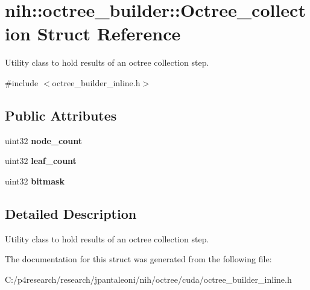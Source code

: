 \hypertarget{structnih_1_1octree__builder_1_1_octree__collection}{
\section{nih\-:\-:octree\-\_\-builder\-:\-:\-Octree\-\_\-collection \-Struct \-Reference}
\label{structnih_1_1octree__builder_1_1_octree__collection}
}


\-Utility class to hold results of an octree collection step.  




{\ttfamily \#include $<$octree\-\_\-builder\-\_\-inline.\-h$>$}

\subsection*{\-Public \-Attributes}
\begin{DoxyCompactItemize}
\item 
\hypertarget{structnih_1_1octree__builder_1_1_octree__collection_ae76a8db6a832f216c484c40f6fce3be2}{
uint32 {\bfseries node\-\_\-count}}
\label{structnih_1_1octree__builder_1_1_octree__collection_ae76a8db6a832f216c484c40f6fce3be2}

\item 
\hypertarget{structnih_1_1octree__builder_1_1_octree__collection_a09baa2dbea46563007ecd94df08b6e6a}{
uint32 {\bfseries leaf\-\_\-count}}
\label{structnih_1_1octree__builder_1_1_octree__collection_a09baa2dbea46563007ecd94df08b6e6a}

\item 
\hypertarget{structnih_1_1octree__builder_1_1_octree__collection_a2429769caa3e63f43db722bd6c8fde9b}{
uint32 {\bfseries bitmask}}
\label{structnih_1_1octree__builder_1_1_octree__collection_a2429769caa3e63f43db722bd6c8fde9b}

\end{DoxyCompactItemize}


\subsection{\-Detailed \-Description}
\-Utility class to hold results of an octree collection step. 

\-The documentation for this struct was generated from the following file\-:\begin{DoxyCompactItemize}
\item 
\-C\-:/p4research/research/jpantaleoni/nih/octree/cuda/octree\-\_\-builder\-\_\-inline.\-h\end{DoxyCompactItemize}
